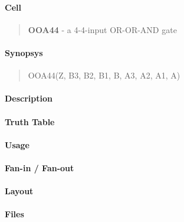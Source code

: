 \label{OOA44}
\paragraph{Cell}
\begin{quote}
    \textbf{OOA44} - a 4-4-input OR-OR-AND gate
\end{quote}

\paragraph{Synopsys}
\begin{quote}
    OOA44(Z, B3, B2, B1, B, A3, A2, A1, A)
\end{quote}

\paragraph{Description}

%

\paragraph{Truth Table}
%

\paragraph{Usage}

\paragraph{Fan-in / Fan-out}

\paragraph{Layout}

\paragraph{Files}
